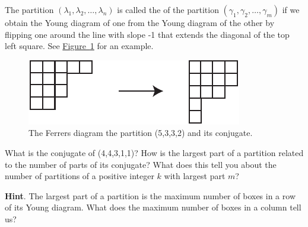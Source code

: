 \documentclass{book}
\begin{document}
\setcounter{cpjt}{304}
\addtocounter{cpjt}{-1}
\begin{activity}\label{activity-297}
\hypertarget{p-1502}{}%
The partition \((\lambda_1,\lambda_2,\ldots, \lambda_n)\) is called the  of the partition \((\gamma_1,\gamma_2,\ldots, \gamma_m)\) if we obtain the Young diagram of one from the Young diagram of the other by flipping one around the line with slope -1 that extends the diagonal of the top left square. See \hyperref[conjugateYoung]{Figure~\ref{conjugateYoung}} for an example.%
\begin{figure}
\centering
\includegraphics[width=0.5\linewidth]{images/conjugateYoung}
\caption{The Ferrers diagram the partition (5,3,3,2) and its conjugate.\label{conjugateYoung}}
\end{figure}
\hypertarget{p-1503}{}%
What is the conjugate of (4,4,3,1,1)? How is the largest part of a partition related to the number of parts of its conjugate? What does this tell you about the number of partitions of a positive integer \(k\) with largest part \(m\)?%
\par\smallskip%
\noindent\textbf{Hint}.\hypertarget{hint-190}{}\quad%
\hypertarget{p-1504}{}%
The largest part of a partition is the maximum number of boxes in a row of its Young diagram. What does the maximum number of boxes in a column tell us?%
\par\smallskip%
\noindent\end{activity}

\clearpage
\end{document}
